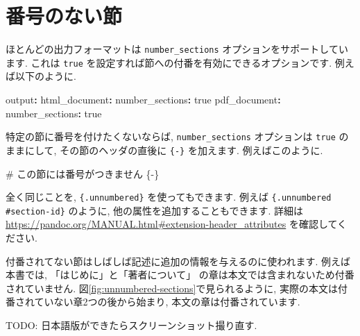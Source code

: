 \documentclass[
  11pt,
]{bxjsreport}
\newenvironment{Shaded}{\begin{snugshade}}{\end{snugshade}}
\newcommand{\AttributeTok}[1]{\textcolor[rgb]{0.77,0.63,0.00}{#1}}
\newcommand{\CharTok}[1]{\textcolor[rgb]{0.31,0.60,0.02}{#1}}
\newcommand{\FunctionTok}[1]{\textcolor[rgb]{0.00,0.00,0.00}{#1}}
\newcommand{\KeywordTok}[1]{\textcolor[rgb]{0.13,0.29,0.53}{\textbf{#1}}}
\begin{document}
\hypertarget{unnumbered-sections}{%
\section{番号のない節}\label{unnumbered-sections}}

ほとんどの出力フォーマットは \texttt{number\_sections} オプションをサポートしています. これは \texttt{true} を設定すれば節への付番を有効にできるオプションです. 例えば以下のように.

\begin{Shaded}
\begin{Highlighting}[]
\FunctionTok{output}\KeywordTok{:}
\AttributeTok{  }\FunctionTok{html\_document}\KeywordTok{:}
\AttributeTok{    }\FunctionTok{number\_sections}\KeywordTok{:}\AttributeTok{ }\CharTok{true}
\AttributeTok{  }\FunctionTok{pdf\_document}\KeywordTok{:}
\AttributeTok{    }\FunctionTok{number\_sections}\KeywordTok{:}\AttributeTok{ }\CharTok{true}
\end{Highlighting}
\end{Shaded}

特定の節に番号を付けたくないならば, \texttt{number\_sections} オプションは \texttt{true} のままにして, その節のヘッダの直後に \texttt{\{-\}} を加えます. 例えばこのように.

\begin{Shaded}
\begin{Highlighting}[]
\FunctionTok{\# この節には番号がつきません \{{-}\}}
\end{Highlighting}
\end{Shaded}

全く同じことを, \texttt{\{.unnumbered\}} を使ってもできます. 例えば \texttt{\{.unnumbered \#section-id\}} のように, 他の属性を追加することもできます. 詳細は \url{https://pandoc.org/MANUAL.html\#extension-header_attributes} を確認してください.

付番されてない節はしばしば記述に追加の情報を与えるのに使われます. 例えば本書では, 「はじめに」と「著者について」 の章は本文では含まれないため付番されていません. 図\ref{fig:unnumbered-sections}で見られるように, 実際の本文は付番されていない章2つの後から始まり, 本文の章は付番されています.

TODO: 日本語版ができたらスクリーンショット撮り直す.
\end{document}
